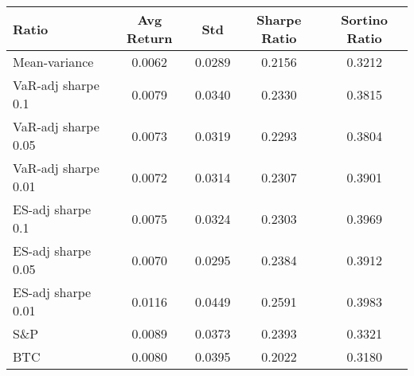 \begin{tabular}{lcccc}
\toprule
Ratio & Avg Return & Std & Sharpe Ratio & Sortino Ratio\\
\midrule
Mean-variance & 0.0062 & 0.0289 & 0.2156 & 0.3212\\
VaR-adj sharpe 0.1 & 0.0079 & 0.0340 & 0.2330 & 0.3815\\
VaR-adj sharpe 0.05 & 0.0073 & 0.0319 & 0.2293 & 0.3804\\
VaR-adj sharpe 0.01 & 0.0072 & 0.0314 & 0.2307 & 0.3901\\
ES-adj sharpe 0.1 & 0.0075 & 0.0324 & 0.2303 & 0.3969\\
ES-adj sharpe 0.05 & 0.0070 & 0.0295 & 0.2384 & 0.3912\\
ES-adj sharpe 0.01 & 0.0116 & 0.0449 & 0.2591 & 0.3983\\
S\&P & 0.0089 & 0.0373 & 0.2393 & 0.3321\\
BTC & 0.0080 & 0.0395 & 0.2022 & 0.3180\\
\bottomrule
\end{tabular}
